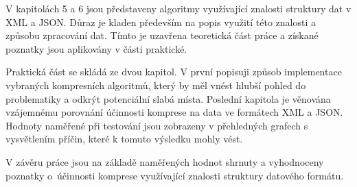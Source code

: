V kapitolách 5 a 6 jsou představeny algoritmy využívající znalosti struktury dat v XML a JSON. Důraz je kladen především na popis využití této znalosti a způsobu zpracování dat. Tímto je uzavřena teoretická část práce a získané poznatky jsou aplikovány v části praktické.

Praktická část se skládá ze dvou kapitol. V první popisuji způsob implementace vybraných kompresních algoritmů, který by měl vnést hlubší pohled do problematiky a odkrýt potenciální slabá místa. Poslední kapitola je věnována vzájemnému porovnání účinnosti komprese na data ve formátech XML a JSON. Hodnoty naměřené při testování jsou zobrazeny v přehledných grafech s vysvětlením příčin, které k tomuto výsledku mohly vést.

V závěru práce jsou na základě naměřených hodnot shrnuty a vyhodnoceny poznatky o~účinnosti komprese využívající znalosti struktury datového formátu.